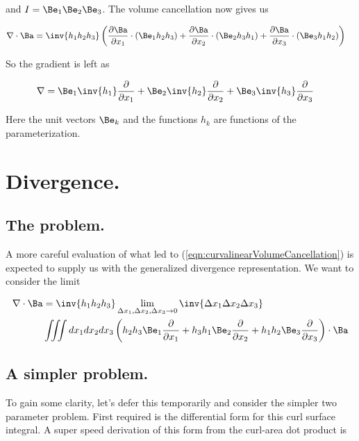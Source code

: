 and $I = \Be_1 \Be_2 \Be_3$.  The volume cancellation now gives us

\begin{align}\label{eqn:curvalinearVolumeCancellation}
\grad \cdot \Ba &=
\inv{h_1 h_2 h_3} \left(
  \PD{x_1}{\Ba} \cdot (\Be_1 h_2 h_3 )
+ \PD{x_2}{\Ba} \cdot (\Be_2 h_3 h_1 )
+ \PD{x_3}{\Ba} \cdot (\Be_3 h_1 h_2 )  \right)
\end{align}

So the gradient is left as

\begin{align}\label{eqn:gradientCurva}
\grad &=
 \Be_1 \inv{h_1} \PD{x_1}{}
+\Be_2 \inv{h_2} \PD{x_2}{}
+\Be_3 \inv{h_3} \PD{x_3}{}
\end{align}

Here the unit vectors $\Be_k$ and the functions $h_k$ are functions of the parameterization.

\section{Divergence.}

\subsection{The problem.}

A more careful evaluation of what led to (\ref{eqn:curvalinearVolumeCancellation}) is expected to supply us with the generalized divergence representation.  We want to consider the limit

\begin{align*}
\grad \cdot \Ba &= 
\inv{h_1 h_2 h_3}
\lim_{
\Delta x_1, \Delta x_2, \Delta x_3 \rightarrow 0}
\inv{\Delta x_1 \Delta x_2 \Delta x_3
} \\
&\iiint dx_1 dx_2 dx_3 \left(
h_2 h_3 \Be_1 \PD{x_1}{}
+h_3 h_1 \Be_2 \PD{x_2}{}
+h_1 h_2 \Be_3 \PD{x_3}{} \right) \cdot \Ba
\end{align*}

\subsection{A simpler problem.}

To gain some clarity, let's defer this temporarily and consider the simpler two parameter problem.  First required is the differential form for this curl surface integral.  A super speed derivation of this form from the curl-area dot product is

